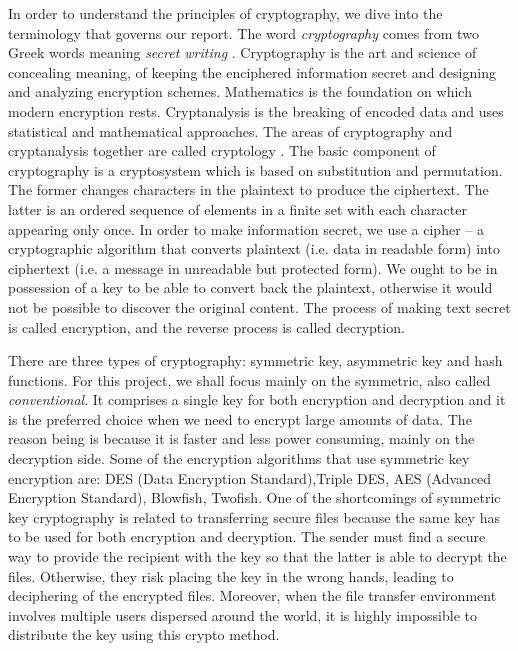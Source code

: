 In order to understand the principles of cryptography, we dive into the terminology that governs our report. The word \emph{cryptography} comes from two Greek words meaning \emph{secret writing} \cite{wikicrypto}. Cryptography is the art and science of concealing meaning, of keeping the enciphered information secret and designing and analyzing encryption schemes. Mathematics is the foundation on which modern encryption rests. Cryptanalysis is the breaking of encoded data and uses statistical and mathematical approaches. The areas of cryptography and cryptanalysis together are called cryptology \cite{wikicrypto}. The basic component of cryptography is a cryptosystem which is based on substitution and permutation. The former changes characters in the plaintext to produce the ciphertext. The latter is an ordered sequence of elements in a finite set with each character appearing only once. In order to make information secret, we use a cipher – a cryptographic algorithm that converts plaintext (i.e. data in readable form) into ciphertext (i.e. a message in unreadable but protected form). We ought to be in possession of a key to be able to convert back the plaintext, otherwise it would not be possible to discover the original content. The process of making text secret is called encryption, and the reverse process is called decryption.

There are three types of cryptography: symmetric key, asymmetric key and hash functions. For this project, we shall focus mainly on the symmetric, also called \emph{conventional}. It comprises a single key for both encryption and decryption and it is the preferred choice when we need to encrypt large amounts of data. The reason being is because it is faster and less power consuming, mainly on the decryption side. Some of the encryption algorithms that use symmetric key encryption are: DES (Data Encryption Standard),Triple DES, AES (Advanced Encryption Standard), Blowfish, Twofish. One of the shortcomings of symmetric key cryptography is related to transferring secure files because the same key has to be used for both encryption and decryption. The sender must find a secure way to provide the recipient with the key so that the latter is able to decrypt the files. Otherwise, they risk placing the key in the wrong hands, leading to deciphering of the encrypted files. Moreover, when the file transfer environment involves multiple users dispersed around the world, it is highly impossible to distribute the key using this crypto method. 

